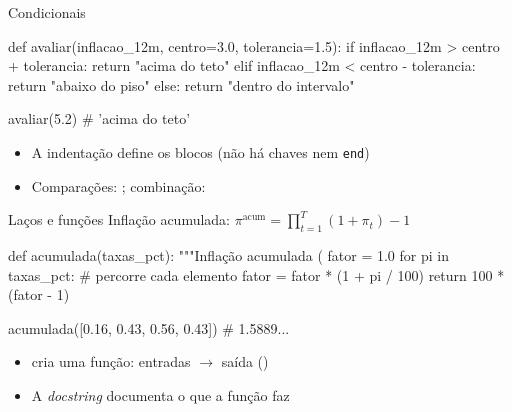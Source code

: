 \documentclass[aspectratio=169,11pt]{beamer}
\begin{document}
\begin{frame}[fragile]{Condicionais}
  \begin{codigo}
    def avaliar(inflacao_12m, centro=3.0, tolerancia=1.5):
        if inflacao_12m > centro + tolerancia:
            return "acima do teto"
        elif inflacao_12m < centro - tolerancia:
            return "abaixo do piso"
        else:
            return "dentro do intervalo"

    avaliar(5.2)     # 'acima do teto'
  \end{codigo}
  \begin{itemize}
    \item A \alert{indentação} define os blocos (não há chaves nem \texttt{end})
    \item Comparações: \py{==  !=  <  <=  >  >=}; combinação: 
  \end{itemize}
\end{frame}

\begin{frame}[fragile]{Laços e funções}
  Inflação acumulada: $\displaystyle \pi^{\text{acum}} = \prod_{t=1}^{T}(1+\pi_t) - 1$
  \begin{codigo}
    def acumulada(taxas_pct):
        """Inflação acumulada (%
        fator = 1.0
        for pi in taxas_pct:          # percorre cada elemento
            fator = fator * (1 + pi / 100)
        return 100 * (fator - 1)

    acumulada([0.16, 0.43, 0.56, 0.43])   # 1.5889...
  \end{codigo}
  \begin{itemize}
    \item {} cria uma função: \alert{entradas} $\to$ \alert{saída} ()
    \item A \emph{docstring} documenta o que a função faz
  \end{itemize}
\end{frame}
\end{document}
